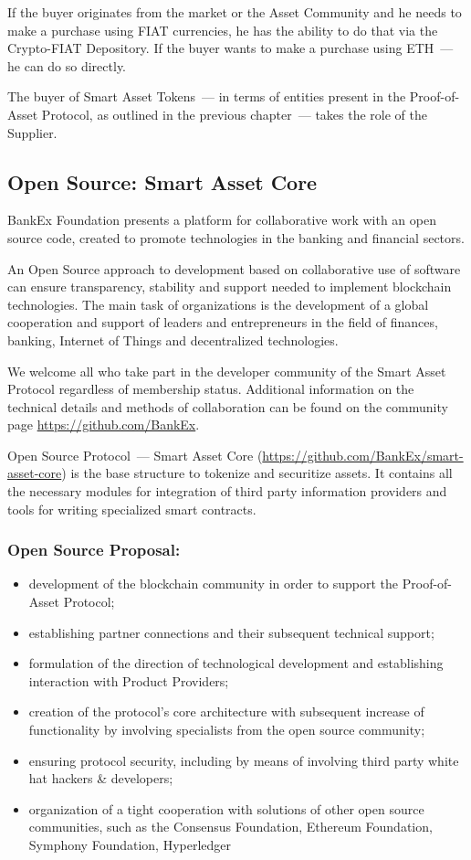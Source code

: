 \documentclass{article}
\begin{document}
\begin{multicols}{2}
If the buyer originates from the market or the Asset Community and he needs to make a purchase using FIAT currencies, he has the ability to do that via the Crypto-FIAT Depository. If the buyer wants to make a purchase using ETH~--- he can do so directly.
	
The buyer of Smart Asset Tokens~--- in terms of entities present in the Proof-of-Asset Protocol, as outlined in the previous chapter~--- takes the role of the Supplier.

\subsection{Open Source: Smart Asset Core}

BankEx Foundation presents a platform for collaborative work with an open source code, created to promote technologies in the banking and financial sectors.

An Open Source approach to development based on collaborative use of software can ensure transparency, stability and support needed to implement blockchain technologies. The main task of organizations is the development of a global cooperation and support of leaders and entrepreneurs in the field of finances, banking, Internet of Things and decentralized technologies. 

We welcome all who take part in the developer community of the Smart Asset Protocol regardless of membership status. Additional information on the technical details and methods of collaboration can be found on the community page \url{https://github.com/BankEx}.

Open Source Protocol~--- Smart Asset Core (\url{https://github.com/BankEx/smart-asset-core}) is the base structure to tokenize and securitize assets. It contains all the necessary modules for integration of third party information providers and tools for writing specialized smart contracts.
	
\subsubsection*{Open Source Proposal:}

\begin{itemize}
\item development of the blockchain community in order to support the Proof-of-Asset Protocol;
\item establishing partner connections and their subsequent technical support;
\item formulation of the direction of technological development and establishing interaction with Product Providers;
\item creation of the protocol’s core architecture with subsequent increase of functionality by involving specialists from the open source community;
\item ensuring protocol security, including by means of involving third party white hat hackers \& developers;
\item organization of a tight cooperation with solutions of other open source communities, such as the Consensus Foundation, Ethereum Foundation, Symphony Foundation, Hyperledger
\end{itemize}
	

\end{multicols}
\end{document}
